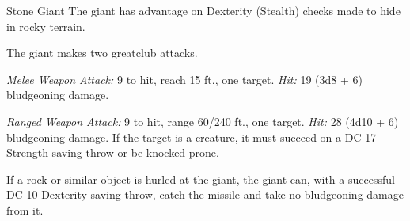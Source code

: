 \documentclass[10pt,a4paper,twoside,bg=print,twocolumn,openany,nodeprecatedcode]{dndbook}
\begin{document}
\begin{DndMonster}[float=t]{Stone Giant}
\DndMonsterBasics[
armor-class = {17 (natural armor)},
hit-points = {\DndDice{11d12 + 55}},
speed = {40 ft.}
]
\DndMonsterAbilityScores[
 str = 23,
 dex = 15,
 con = 20,
 int = 10,
 wis = 12,
 cha = 9
]
\DndMonsterDetails[
saving-throws = {Dex +5, Con +8, Wis +4},
skills = {Athletics +12, Perception +4},
senses = {darkvision 60 ft., passive perception 14},
languages = {Giant},
challenge = 7,
]
The giant has advantage on Dexterity (Stealth) checks made to hide in rocky terrain.

The giant makes two greatclub attacks.

\textsl{Melee Weapon Attack:} 9 to hit, reach 15 ft., one target. \textsl{Hit:} 19 (3d8 + 6) bludgeoning damage.

\textsl{Ranged Weapon Attack:} 9 to hit, range 60/240 ft., one target. \textsl{Hit:} 28 (4d10 + 6) bludgeoning damage. If the target is a creature, it must succeed on a DC 17 Strength saving throw or be knocked prone.

If a rock or similar object is hurled at the giant, the giant can, with a successful DC 10 Dexterity saving throw, catch the missile and take no bludgeoning damage from it.

\end{DndMonster}
\end{document}
